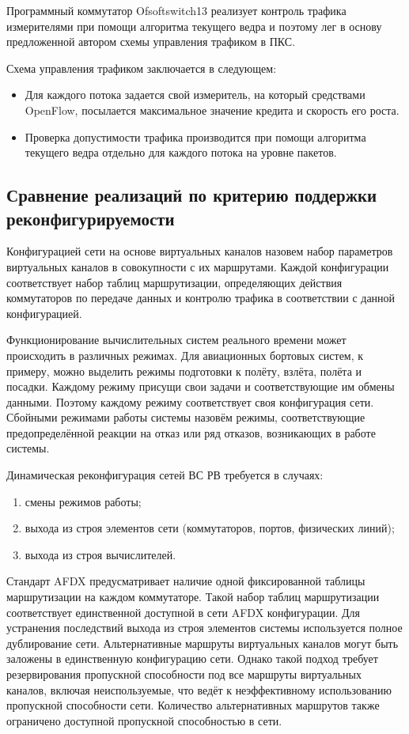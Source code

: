 \documentclass[12pt, a4paper]{article}
\begin{document}
Программный коммутатор Ofsoftswitch13 \cite{ofsoftswitch} реализует контроль трафика измерителями при помощи алгоритма текущего ведра и поэтому лег в основу предложенной автором схемы управления трафиком в ПКС.

Схема управления трафиком заключается в следующем:
\begin{itemize}
	\item Для каждого потока задается свой измеритель, на который средствами OpenFlow, посылается максимальное значение кредита и скорость его роста.
	\item Проверка допустимости трафика производится при помощи алгоритма текущего ведра отдельно для каждого потока на уровне пакетов.
\end{itemize}

\FloatBarrier
\subsection{Сравнение реализаций по критерию поддержки реконфигурируемости} \label{subsec:reconf}

Конфигурацией сети на основе виртуальных каналов назовем набор параметров виртуальных каналов в совокупности с их маршрутами. Каждой конфигурации соответствует набор таблиц маршрутизации, определяющих действия коммутаторов по передаче данных и контролю трафика в соответствии с данной конфигурацией.

Функционирование вычислительных систем реального времени может происходить в различных режимах. Для авиационных бортовых систем, к примеру, можно выделить режимы подготовки к полёту, взлёта, полёта и посадки. Каждому режиму присущи свои задачи и соответствующие им обмены данными. Поэтому каждому режиму соответствует своя конфигурация сети. Сбойными режимами работы системы назовём режимы, соответствующие предопределённой реакции на отказ или ряд отказов, возникающих в работе системы.

Динамическая реконфигурация сетей ВС РВ требуется в случаях:
\begin{enumerate}
	\item смены режимов работы;
	\item выхода из строя элементов сети (коммутаторов, портов, физических линий);
	\item выхода из строя вычислителей.
\end{enumerate}

Стандарт AFDX предусматривает наличие одной фиксированной таблицы маршрутизации на каждом коммутаторе. Такой набор таблиц маршрутизации соответствует единственной доступной в сети AFDX конфигурации. Для устранения последствий выхода из строя элементов системы используется полное дублирование сети. Альтернативные маршруты виртуальных каналов могут быть заложены в единственную конфигурацию сети. Однако такой подход требует резервирования пропускной способности под все маршруты виртуальных каналов, включая неиспользуемые, что ведёт к неэффективному использованию пропускной способности сети. Количество альтернативных маршрутов также ограничено доступной пропускной способностью в сети.
\end{document}
